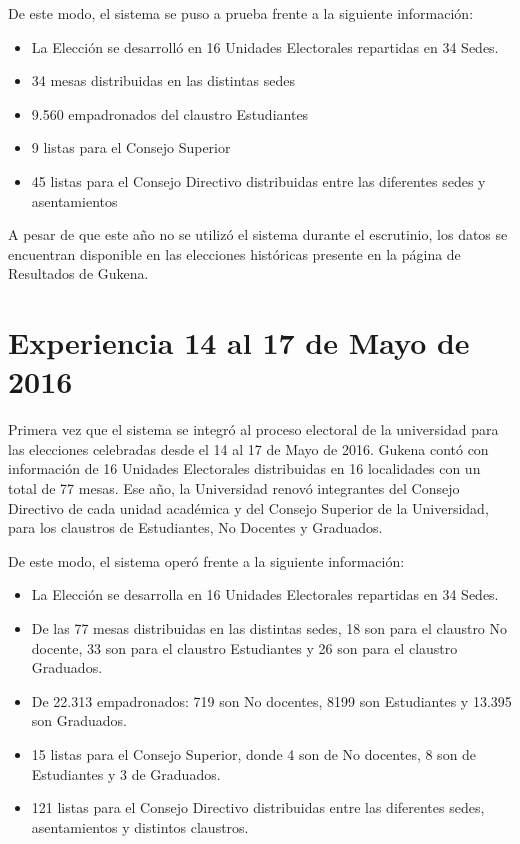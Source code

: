 De este modo, el sistema se puso a prueba frente a la siguiente información:
\begin{itemize}
    \item La Elección se desarrolló en 16 Unidades Electorales repartidas en 34 Sedes.
    \item 34 mesas distribuidas en las distintas sedes
    \item 9.560 empadronados del claustro Estudiantes
    \item 9 listas para el Consejo Superior
    \item 45 listas para el Consejo Directivo distribuidas entre las diferentes sedes y asentamientos
\end{itemize}
A pesar de que este año no se utilizó el sistema durante el escrutinio, los datos se encuentran disponible en las elecciones históricas presente en la página de Resultados de Gukena.

\section{Experiencia 14 al 17 de Mayo de 2016}
\label{exp2016}
Primera vez que el sistema se integró al proceso electoral de la universidad para las elecciones celebradas desde el 14 al 17 de Mayo de 2016. Gukena contó con información de 16 Unidades Electorales distribuidas en 16 localidades con un total de 77 mesas. 
Ese año, la Universidad renovó integrantes del Consejo Directivo de cada unidad académica y del Consejo Superior de la Universidad, para los claustros de Estudiantes, No Docentes y Graduados. 

De este modo, el sistema operó frente a la siguiente información:
\begin{itemize}
    \item La Elección se desarrolla en 16 Unidades Electorales repartidas en 34 Sedes.
    \item De las 77 mesas distribuidas en las distintas sedes, 18 son para el claustro No docente, 33 son para el claustro Estudiantes y 26 son para el claustro Graduados.
    \item De 22.313 empadronados: 719 son No docentes, 8199 son Estudiantes y 13.395 son Graduados. 
    \item 15 listas para el Consejo Superior, donde 4 son de No docentes, 8 son de Estudiantes y 3 de Graduados.
    \item 121 listas para el Consejo Directivo distribuidas entre las diferentes sedes, asentamientos y distintos claustros.
\end{itemize}

